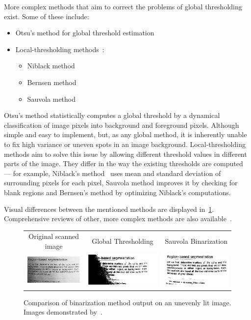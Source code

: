 More complex methods that aim to correct the problems of global thresholding exist. Some of these include:
\begin{itemize}
\item Otsu's method for global threshold estimation~\citep{otsu}
\item Local-thresholding methods~\citep{localOtherBin}:
\begin{itemize}
\item Niblack method
\item Bernsen method
\item Sauvola method
\end{itemize}
\end{itemize}

Otsu's method statistically computes a global threshold by a dynamical classification of image pixels into background and foreground pixels. Although simple and easy to implement, but, as any global method, it is inherently unable to fix high variance or uneven spots in an image background. Local-thresholding methods aim to solve this issue by allowing different threshold values in different parts of the image. They differ in the way the existing thresholds are computed --- for example, Niblack's method~\citep{adaptiveBin} uses mean and standard deviation of surrounding pixels for each pixel, Sauvola method improves it by checking for blank regions and Bernsen's method by optimizing Niblack's computations. 

Visual differences between the mentioned methods are displayed in~\cref{fig:preprocessBinarization}. Comprehensive reviews of other, more complex methods are also available~\citep{localOtherBin}.

\begin{figure}
\centering
{\sffamily
\begin{tabular}{ccc}
Original scanned image &
Global Thresholding &
Sauvola Binarization \\
\includegraphics[width=.3\linewidth]{img/preprocessing/bin_orig.png} &
\includegraphics[width=.3\linewidth]{img/preprocessing/bin_glob.png} &
\includegraphics[width=.3\linewidth]{img/preprocessing/bin_sauvola.png}
\end{tabular}
}
\caption{Comparison of binarization method output on an unevenly lit image. Images demonstrated by~\citet{binarizationComp}.}
\label{fig:preprocessBinarization}
\end{figure}

